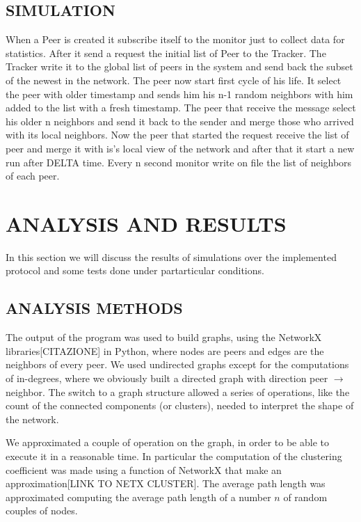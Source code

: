 \documentclass[a4paper,12pt,notitlepage]{article} %
\begin{document}
\subsection{SIMULATION}
	When a Peer is created it subscribe itself to the monitor just to collect data for statistics. After it send a 
request the initial list of Peer to the Tracker. The Tracker write it to the global list of peers in the system and send 
back the subset of the newest in the network. The peer now start first cycle of his life. It select the peer with older 
timestamp and sends him his n-1 random neighbors with him added to the list with a fresh timestamp. The peer that receive 
the message select his older n neighbors and send it back to the sender and merge those who arrived with its local 
neighbors. Now the peer that started the request receive the list of peer and merge it with is's local view of the network 
and after that it start a new run after DELTA time. Every n second monitor write on file the list of neighbors of each 
peer.





\section{ANALYSIS AND RESULTS}

In this section we will discuss the results of simulations over the implemented protocol and some tests done under
 partarticular conditions.

\subsection{ANALYSIS METHODS}

The output of the program was used to build  graphs, using the NetworkX libraries[CITAZIONE] in Python, where
 nodes are peers and edges are the neighbors of every peer. We used undirected graphs except for the 
 computations of in-degrees, where we obviously built a directed graph with direction peer \(\rightarrow\) neighbor.
 The switch to a graph structure allowed a series of operations, like the count of the connected components (or clusters), 
 needed to interpret the shape of the network.

We approximated a couple of operation on the graph, in order to be able to execute it in a reasonable time. In 
 particular the computation of the clustering coefficient was made using a function of NetworkX that make an 
approximation[LINK TO NETX CLUSTER]. The average path length was approximated computing the average path length of a number 
\(n\) of random couples of nodes.
\end{document}
